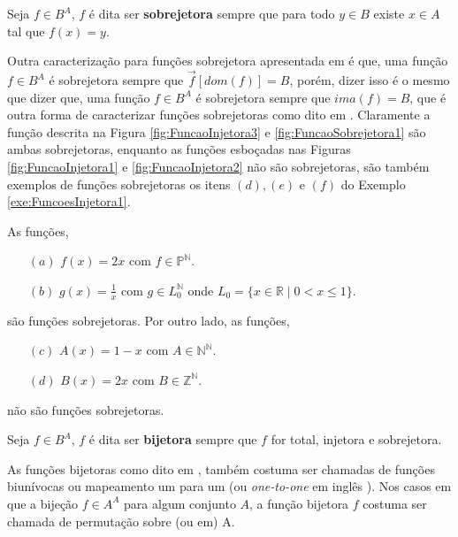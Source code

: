 \begin{definicao}\label{def:FuncaoSobrejetora}
	Seja $f \in B^A$, $f$ é dita ser \textbf{sobrejetora} sempre que para todo $y \in B$ existe $x \in A$ tal que $f(x) = y$.
\end{definicao}

Outra caracterização para funções sobrejetora apresentada em \cite{lipschutz1971-Topo} é que, uma função $f \in B^A$ é sobrejetora sempre que $\overrightarrow{f}[dom(f)] = B$, porém, dizer isso é o mesmo que dizer que,  uma função $f \in B^A$ é sobrejetora sempre que $ima(f) = B$, que é outra forma de caracterizar funções sobrejetoras como dito em \cite{carmo2013}. Claramente a função descrita na Figura \ref{fig:FuncaoInjetora3} e \ref{fig:FuncaoSobrejetora1} são ambas sobrejetoras, enquanto as funções esboçadas nas Figuras \ref{fig:FuncaoInjetora1} e \ref{fig:FuncaoInjetora2} não são sobrejetoras, são também exemplos de funções sobrejetoras os itens $(d), (e)$ e $(f)$ do Exemplo \ref{exe:FuncoesInjetora1}.

\begin{exemplo}\label{exe:FuncaoSobrejetora}
	As funções,
	\begin{itemize}
		\item[$(a)$] $f(x) = 2x$ com $f \in \mathbb{P}^\mathbb{N}$.
		\item[$(b)$] $g(x) = \displaystyle\frac{1}{x}$ com $g \in L_0^{\mathbb{N}}$ onde $L_0 = \{x \in \mathbb{R} \mid 0 < x \leq 1\}$.
	\end{itemize} 
	são funções sobrejetoras. Por outro lado, as funções,
	\begin{itemize}
		\item[$(c)$] $A(x) = 1 - x$ com $A \in \mathbb{N}^\mathbb{N}$.
		\item[$(d)$] $B(x) = 2x$ com $B \in \mathbb{Z}^\mathbb{N}$.
	\end{itemize}
	não são funções sobrejetoras.
\end{exemplo}

\begin{definicao}\label{def:FuncaoBijetora}
	Seja $f \in B^A$, $f$ é dita ser \textbf{bijetora} sempre que $f$ for total, injetora e sobrejetora.
\end{definicao}

As funções bijetoras como dito em \cite{lipschutz1971-Topo}, também costuma ser chamadas de funções biunívocas ou mapeamento um para um (ou \textit{one-to-one} em inglês \cite{carmo2013}). Nos casos em que a bijeção $f \in A^A$ para algum conjunto $A$, a função bijetora $f$ costuma ser chamada de permutação \cite{carmo2013} sobre (ou em) A. 

